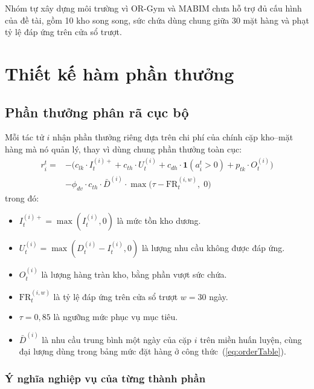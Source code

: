 Nhóm tự xây dựng môi trường vì OR-Gym \parencite{hubbs2020orgym} và MABIM \parencite{yang2023mabim} chưa hỗ trợ đủ cấu hình của đề tài, gồm 10 kho song song, sức chứa dùng chung giữa 30 mặt hàng và phạt tỷ lệ đáp ứng trên cửa sổ trượt.

\section{Thiết kế hàm phần thưởng}
\label{sec:hamThuong}

\subsection{Phần thưởng phân rã cục bộ}
\label{subsec:localReward}

Mỗi tác tử $i$ nhận phần thưởng riêng dựa trên chi phí của chính cặp kho--mặt hàng mà nó quản lý, thay vì dùng chung phần thưởng toàn cục:
\begin{equation}
    \begin{split}
    r_i^t = {} & -\bigl(
    c_{lk} \cdot I_t^{(i)+} +
    c_{th} \cdot U_t^{(i)} +
    c_{dh} \cdot \mathbf{1}(a_i^t > 0) +
    p_{tk} \cdot O_t^{(i)}
    \bigr) \\
    & - \phi_{dv} \cdot c_{th} \cdot \bar{D}^{(i)} \cdot
    \max\bigl(\tau - \text{FR}_t^{(i, w)},\; 0\bigr)
    \end{split}
    \label{eq:localReward}
\end{equation}
trong đó:
\begin{itemize}
    \item $I_t^{(i)+} = \max(I_t^{(i)}, 0)$ là mức tồn kho dương.
    \item $U_t^{(i)} = \max(D_t^{(i)} - I_t^{(i)}, 0)$ là lượng nhu cầu không được đáp ứng.
    \item $O_t^{(i)}$ là lượng hàng tràn kho, bằng phần vượt sức chứa.
    \item $\text{FR}_t^{(i, w)}$ là tỷ lệ đáp ứng trên cửa sổ trượt $w = 30$ ngày.
    \item $\tau = 0{,}85$ là ngưỡng mức phục vụ mục tiêu.
    \item $\bar{D}^{(i)}$ là nhu cầu trung bình một ngày của cặp $i$ trên miền huấn luyện, cùng đại lượng dùng trong bảng mức đặt hàng ở công thức~(\ref{eq:orderTable}).
\end{itemize}

\subsubsection{Ý nghĩa nghiệp vụ của từng thành phần}

